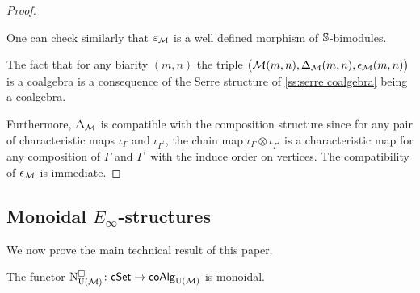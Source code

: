 \begin{proof}
\begin{center}
		\qquad
	\end{center}	
	One can check similarly that $\varepsilon_\M$ is a well defined morphism of $\S$-bimodules.
	
	The fact that for any biarity $(m,n)$ the triple $\big( \M(m,n), \Delta_\M(m,n), \epsilon_\M(m,n) \big)$ is a coalgebra is a consequence of the Serre structure of \cref{ss:serre coalgebra} being a coalgebra.
	
	Furthermore, $\Delta_\M$ is compatible with the composition structure since for any pair of characteristic maps $\iota_\Gamma$ and $\iota_{\Gamma^\prime}$, the chain map $\iota_\Gamma \otimes \iota_{\Gamma^\prime}$ is a characteristic map for any composition of $\Gamma$ and $\Gamma^\prime$ with the induce order on vertices.
	The compatibility of $\epsilon_\M$ is immediate.
\end{proof}

\subsection{Monoidal $E_{\infty}$-structures} 

We now prove the main technical result of this paper.

\begin{lemma} \label{l:cubical e-infty chains are monoidal}
	The functor $\cchainsUM \colon \cSet \to \coAlg_\UM$ is monoidal.
\end{lemma}

